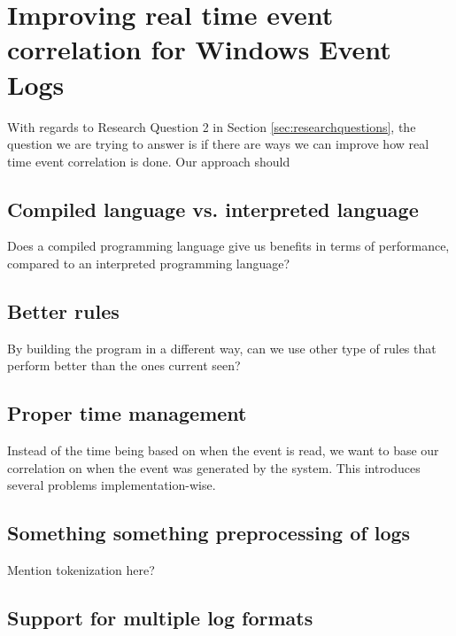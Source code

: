 \section{Improving real time event correlation for Windows Event Logs}
\label{sec:improving-real-time-event-correlation-for-windows-event-logs}

With regards to Research Question 2 in Section \ref{sec:researchquestions}, the question we are trying to answer is if there are ways we can improve how real time event correlation is done. Our approach should 

\subsection{Compiled language vs. interpreted language}
\label{sub:use-compiled-language}

Does a compiled programming language give us benefits in terms of performance, compared to an interpreted programming language?


\subsection{Better rules}
\label{sub:better-rules}

By building the program in a different way, can we use other type of rules that perform better than the ones current seen?

\subsection{Proper time management}
\label{sub:time-management}

Instead of the time being based on when the event is read, we want to base our correlation on when the event was generated by the system. This introduces several problems implementation-wise.

\subsection{Something something preprocessing of logs}

Mention tokenization here?

\subsection{Support for multiple log formats}
\label{sub:multiple-log-formats}

